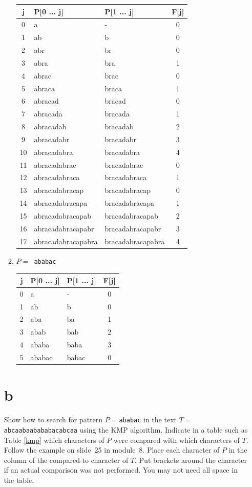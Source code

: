 \documentclass[12pt]{article}
\begin{document}
\begin{itemize}
\begin{enumerate}
\begin{tabular}{c|l|l|c}
  \hline
  \textbf{j} & \textbf{P[0 ... j]} & \textbf{P[1 ... j]} & \textbf{F[j]}\\
  \hline
  0 & a & - & 0 \\
  1 & ab & b & 0 \\
  2 & abr & br & 0 \\
  3 & abra & bra & 1 \\
  4 & abrac & brac & 0 \\
  5 & abraca & braca & 1 \\
  6 & abracad & bracad & 0 \\
  7 & abracada & bracada & 1 \\
  8 & abracadab & bracadab & 2 \\
  9 & abracadabr & bracadabr & 3 \\
  10 & abracadabra & bracadabra & 4 \\
  11 & abracadabrac & bracadabrac & 0 \\
  12 & abracadabraca & bracadabraca & 1 \\
  13 & abracadabracap & bracadabracap & 0 \\
  14 & abracadabracapa & bracadabracapa & 1 \\
  15 & abracadabracapab & bracadabracapab & 2 \\
  16 & abracadabracapabr & bracadabracapabr & 3 \\
  17 & abracadabracapabra & bracadabracapabra & 4 \\
\end{tabular}

\item $P = ${\tt~ababac}
\begin{tabular}{c|l|l|c}
  \hline
  \textbf{j} & \textbf{P[0 ... j]} & \textbf{P[1 ... j]} & \textbf{F[j]}\\
  \hline
  0 & a & - & 0 \\
  1 & ab & b & 0 \\
  2 & aba & ba & 1 \\
  3 & abab & bab & 2 \\
  4 & ababa & baba & 3 \\
  5 & ababac & babac & 0 \\
\end{tabular}

\end{enumerate}
\part{b}
Show how to search for pattern $P=$\texttt{ababac} in the text $T=$\texttt{abcaabaabababacabcaa} using the KMP algorithm. Indicate in a table such as Table \ref{kmp} which characters of $P$ were compared with which characters of $T$. Follow the example on slide~25 in module~8. Place each character of $P$ in the column of the compared-to character of $T$.  Put brackets around the character if an actual comparison was not performed. You may not need all space in the table.
\end{itemize}
\end{document}
